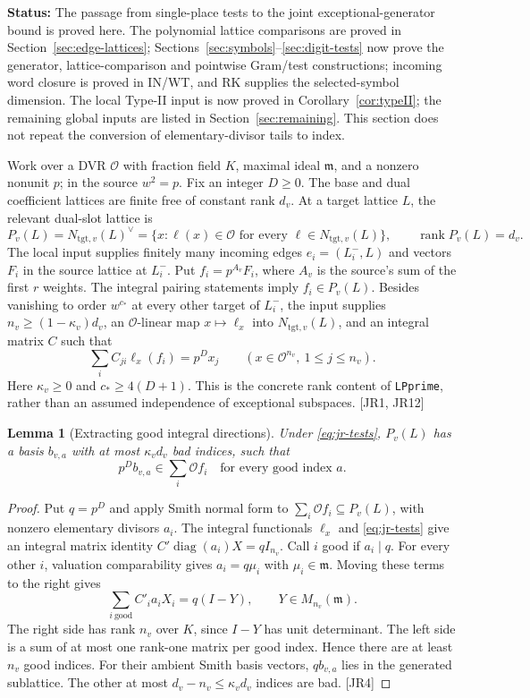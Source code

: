 \documentclass[11pt,a4paper]{article}
\numberwithin{equation}{section}
\newtheorem{lemma}[theorem]{Lemma}
\theoremstyle{remark}\newtheorem{remark}[theorem]{Remark}
\newcommand{\status}[1]{\textbf{Status:} #1}
\begin{document}
\status{The passage from single-place tests to the joint exceptional-generator bound is proved here. The polynomial lattice comparisons are proved in Section~\ref{sec:edge-lattices}; Sections~\ref{sec:symbols}--\ref{sec:digit-tests} now prove the generator, lattice-comparison and pointwise Gram/test constructions; incoming word closure is proved in IN/WT, and RK supplies the selected-symbol dimension. The local Type-II input is now proved in Corollary~\ref{cor:typeII}; the remaining global inputs are listed in Section~\ref{sec:remaining}. This section does not repeat the conversion of elementary-divisor tails to index.}

Work over a DVR $\mathcal O$ with fraction field $K$, maximal ideal $\mathfrak m$, and a nonzero nonunit $p$; in the source $w^2=p$. Fix an integer $D\ge0$. The base and dual coefficient lattices are finite free of constant rank $d_v$. At a target lattice $L$, the relevant dual-slot lattice is
\[
 P_v(L)=N_{\mathrm{tgt},v}(L)^\vee
   =\{x:\ell(x)\in\mathcal O\text{ for every }\ell\in N_{\mathrm{tgt},v}(L)\},
 \qquad \operatorname{rank}P_v(L)=d_v.
\]
The local input supplies finitely many incoming edges $e_i=(L_i^-,L)$ and vectors $F_i$ in the source lattice at $L_i^-$. Put $f_i=p^{A_v}F_i$, where $A_v$ is the source's sum of the first $r$ weights. The integral pairing statements imply $f_i\in P_v(L)$. Besides vanishing to order $w^{c_*}$ at every other target of $L_i^-$, the input supplies $n_v\ge(1-\kappa_v)d_v$, an $\mathcal O$-linear map $x\mapsto\ell_x$ into $N_{\mathrm{tgt},v}(L)$, and an integral matrix $C$ such that
\begin{equation}\label{eq:jr-tests}
 \sum_i C_{ji}\ell_x(f_i)=p^D x_j
 \qquad(x\in\mathcal O^{n_v},\ 1\le j\le n_v).
\end{equation}
Here $\kappa_v\ge0$ and $c_*\ge4(D+1)$. This is the concrete rank content of \texttt{LPprime}, rather than an assumed independence of exceptional subspaces. \textsf{[JR1, JR12]}

\begin{lemma}[Extracting good integral directions]\label{lem:jr-smith}
Under \eqref{eq:jr-tests}, $P_v(L)$ has a basis $b_{v,a}$ with at most $\kappa_vd_v$ bad indices, such that
\[
 p^D b_{v,a}\in\sum_i\mathcal O f_i
 \quad\text{for every good index }a.
\]
\end{lemma}
\begin{proof}
Put $q=p^D$ and apply Smith normal form to $\sum_i\mathcal O f_i\subseteq P_v(L)$, with nonzero elementary divisors $a_i$. The integral functionals $\ell_x$ and \eqref{eq:jr-tests} give an integral matrix identity $C'\operatorname{diag}(a_i)X=qI_{n_v}$. Call $i$ good if $a_i\mid q$. For every other $i$, valuation comparability gives $a_i=q\mu_i$ with $\mu_i\in\mathfrak m$. Moving these terms to the right gives
\[
 \sum_{i\ \mathrm{good}} C'_i a_i X_i=q(I-Y),
 \qquad Y\in M_{n_v}(\mathfrak m).
\]
The right side has rank $n_v$ over $K$, since $I-Y$ has unit determinant. The left side is a sum of at most one rank-one matrix per good index. Hence there are at least $n_v$ good indices. For their ambient Smith basis vectors, $q b_{v,a}$ lies in the generated sublattice. The other at most $d_v-n_v\le\kappa_vd_v$ indices are bad. \textsf{[JR4]}
\end{proof}
\end{document}
